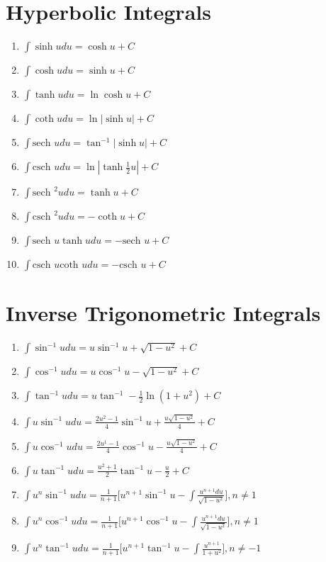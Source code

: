 \documentclass[12pt, letterpaper]{article}
\begin{document}
\section{Hyperbolic Integrals}
\begin{enumerate}
  \item $\int \limits \sinh u du = \cosh u +C$
  \item $\int \limits \cosh u du = \sinh u +C$
  \item $\int \limits \tanh u du = \ln \cosh u +C$
  \item $\int \limits \coth u du = \ln | \sinh u | +C$
  \item $\int \limits \text{sech } u du = \tan ^{-1} | \sinh u | +C$
  \item $\int \limits \text{csch } u du = \ln | \tanh \frac{1}{2} u | +C$
  \item $\int \limits \text{sech } ^2 u du = \tanh u +C$
  \item $\int \limits \text{csch } ^2 u du = -\coth u +C$
  \item $\int \limits \text{sech } u \tanh u du = - \text{sech } u +C$
  \item $\int \limits \text{csch } u \text{coth } u du = -\text{csch } u +C$
\end{enumerate}

\section{Inverse Trigonometric Integrals}
\begin{enumerate}
  \item $\int \limits \sin ^{-1} u du = u \sin ^{-1} u + \sqrt{1-u^2} +C$
  \item $\int \limits \cos ^{-1} u du = u \cos ^{-1} u - \sqrt{1-u^2} +C$
  \item $\int \limits \tan ^{-1} u du = u \tan ^{-1} - \frac{1}{2} \ln (1+u^2) +C$
  \item $\int \limits u \sin ^{-1} u du = \frac{2u^2-1}{4} \sin ^{-1} u + \frac{u\sqrt{1-u^2}}{4} +C$
  \item $\int \limits u \cos ^{-1} u du = \frac{2u^1-1}{4} \cos ^{-1} u - \frac{u\sqrt{1-u^2}}{4} +C$
  \item $\int \limits u \tan ^{-1} u du = \frac{u^2+1}{2} \tan^{-1} u -\frac{u}{2} +C$
  \item $\int \limits u^n \sin ^{-1} u du = \frac{1}{n+1} \Big[ u^{n+1} \sin ^{-1} u - \int \limits \frac{u^{n+1} du}{\sqrt{1-u^2}}\Big], n \neq 1$
  \item $\int \limits u^n \cos ^{-1} u du = \frac{1}{n+1} \Big[ u^{n+1} \cos ^{-1} u - \int \limits \frac{u^{n+1} du}{\sqrt{1-u^2}}\Big], n \neq 1$
  \item $\int \limits u^n \tan ^{-1} u du = \frac{1}{n+1} \Big[ u^{n+1} \tan ^{-1} u - \int \limits \frac{u^{n+1}}{1+u^2}\Big], n \neq -1$
\end{enumerate}
\end{document}
